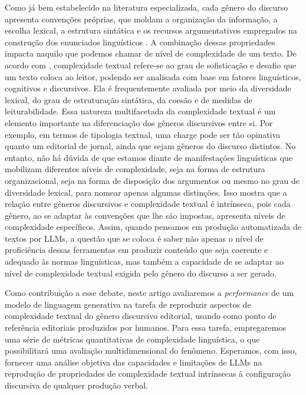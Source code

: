 \documentclass[portuguese]{textolivre}
\begin{document}
Como já bem estabelecido na literatura especializada, cada gênero do discurso apresenta convenções próprias, que moldam a organização da informação, a escolha lexical, a estrutura sintática e os recursos argumentativos empregados na construção dos enunciados linguísticos \cite{Bakhtin1997}.
A combinação dessas propriedades impacta naquilo que podemos chamar de nível de complexidade de um texto.
De acordo com  \textcite{Frantz2015}, complexidade textual refere-se ao grau de sofisticação e desafio que um texto coloca ao leitor, podendo ser analisada com base em fatores linguísticos, cognitivos e discursivos.
Ela é frequentemente avaliada por meio da diversidade lexical, do grau de estruturação sintática, da coesão e de medidas de leiturabilidade.
Essa natureza multifacetada da complexidade textual é um elemento importante na diferenciação dos gêneros discursivos entre si.
Por exemplo, em termos de tipologia textual, uma charge pode ser tão opinativa quanto um editorial de jornal, ainda que sejam gêneros do discurso distintos.
No entanto, não há dúvida de que estamos diante de manifestações linguísticas que mobilizam diferentes níveis de complexidade, seja na forma de estrutura organizacional, seja na forma de disposição dos argumentos ou mesmo no grau de diversidade lexical, para nomear apenas algumas distinções.
Isso mostra que a relação entre gêneros discursivos e complexidade textual é intrínseca, pois cada gênero, ao se adaptar às convenções que lhe são impostas, apresenta níveis de complexidade específicos.
Assim, quando pensamos em produção automatizada de textos por LLMs, a questão que se coloca é saber não apenas o nível de proficiência dessas ferramentas em produzir conteúdo que seja coerente e adequado às normas linguísticas, mas também a capacidade de se adaptar ao nível de complexidade textual exigida pelo gênero do discurso a ser gerado.

Como contribuição a esse debate, neste artigo avaliaremos a \emph{performance} de um modelo de linguagem generativa na tarefa de reproduzir aspectos de complexidade textual do gênero discursivo editorial, usando como ponto de referência editoriais produzidos por humanos.
Para essa tarefa, empregaremos uma série de métricas quantitativas de complexidade linguística, o que possibilitará uma avaliação multidimensional do fenômeno.
Esperamos, com isso, fornecer uma análise objetiva das capacidades e limitações de LLMs na reprodução de propriedades de complexidade textual intrínsecas à configuração discursiva de qualquer produção verbal.
\end{document}
